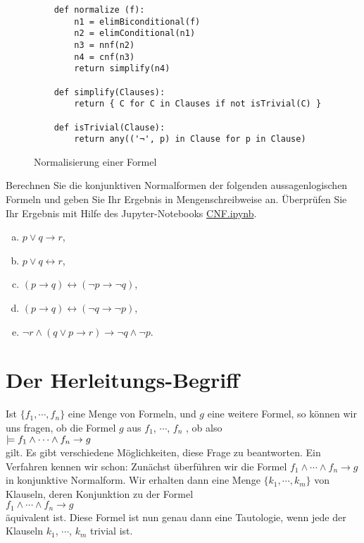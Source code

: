 \begin{figure}[!ht]
  \centering
\begin{verbatim}
    def normalize (f):
        n1 = elimBiconditional(f)
        n2 = elimConditional(n1)
        n3 = nnf(n2)
        n4 = cnf(n3)
        return simplify(n4)
    
    def simplify(Clauses):
        return { C for C in Clauses if not isTrivial(C) }
    
    def isTrivial(Clause):
        return any(('¬', p) in Clause for p in Clause)
\end{verbatim} 
\vspace*{-0.3cm}
  \caption{Normalisierung einer Formel}
  \label{fig:normalize}
\end{figure}

\exercise
Berechnen Sie die konjunktiven Normalformen der folgenden aussagenlogischen Formeln und geben Sie Ihr Ergebnis
in Mengenschreibweise an.  Überprüfen Sie Ihr Ergebnis mit Hilfe des Jupyter-Notebooks 
\href{https://github.com/karlstroetmann/Logic/blob/master/Python/CNF.ipynb}{CNF.ipynb}.
\begin{enumerate}[(a)]
\item $p \vee q \rightarrow r$,
\item $p \vee q \leftrightarrow r$,
\item $(p \rightarrow q) \leftrightarrow (\neg p \rightarrow \neg q)$,
\item $(p \rightarrow q) \leftrightarrow (\neg q \rightarrow \neg p)$,
\item $\neg r \wedge (q \vee p \rightarrow r) \rightarrow \neg q \wedge \neg p$.
\end{enumerate}


\section{Der Herleitungs-Begriff}
Ist $\{f_1,\cdots,f_n\}$ eine Menge von Formeln, und $g$ eine weitere Formel, so
können wir uns fragen, ob  die  Formel $g$ aus $f_1$, $\cdots$, $f_n$ , ob
also 
\\[0.2cm]
\hspace*{1.3cm}
$\displaystyle \models f_1 \wedge \cdots \wedge f_n \rightarrow g$
\\[0.2cm]
gilt.
Es gibt verschiedene Möglichkeiten, diese Frage zu beantworten.  Ein Verfahren kennen wir
schon: Zunächst überführen wir die Formel  $f_1 \wedge \cdots \wedge f_n \rightarrow g$ in
konjunktive Normalform.  Wir erhalten dann eine Menge
$\{k_1,\cdots,k_m\}$ von Klauseln, deren Konjunktion zu der  Formel
\\[0.2cm]
\hspace*{1.3cm}
$f_1 \wedge \cdots \wedge f_n \rightarrow g$
\\[0.2cm] 
äquivalent ist.  Diese Formel ist nun genau dann eine Tautologie, wenn
jede der Klauseln $k_1$, $\cdots$, $k_m$ trivial ist.  

